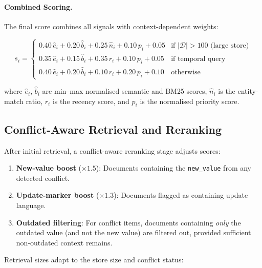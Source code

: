 \documentclass[11pt,a4paper]{article}
\begin{document}
\paragraph{Combined Scoring.}
The final score combines all signals with context-dependent weights:

\begin{equation}
    s_i = \begin{cases}
        0.40\,\hat{e}_i + 0.20\,\hat{b}_i + 0.25\,\hat{n}_i + 0.10\,p_i + 0.05
            & \text{if } |\mathcal{D}| > 100 \text{ (large store)} \\[4pt]
        0.35\,\hat{e}_i + 0.15\,\hat{b}_i + 0.35\,r_i + 0.10\,p_i + 0.05
            & \text{if temporal query} \\[4pt]
        0.40\,\hat{e}_i + 0.20\,\hat{b}_i + 0.10\,r_i + 0.20\,p_i + 0.10
            & \text{otherwise}
    \end{cases}
\label{eq:combined}
\end{equation}

where $\hat{e}_i$, $\hat{b}_i$ are min--max normalised semantic and BM25
scores, $\hat{n}_i$ is the entity-match ratio, $r_i$ is the recency score,
and $p_i$ is the normalised priority score.


\subsection{Conflict-Aware Retrieval and Reranking}
\label{sec:reranking}

After initial retrieval, a conflict-aware reranking stage adjusts scores:
\begin{enumerate}[nosep]
    \item \textbf{New-value boost} ($\times 1.5$): Documents containing the
          \texttt{new\_value} from any detected conflict.
    \item \textbf{Update-marker boost} ($\times 1.3$): Documents flagged as
          containing update language.
    \item \textbf{Outdated filtering}: For conflict items, documents containing
          \emph{only} the outdated value (and not the new value) are filtered out,
          provided sufficient non-outdated context remains.
\end{enumerate}

Retrieval sizes adapt to the store size and conflict status:
\end{document}
